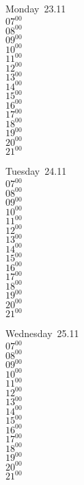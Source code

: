 \documentclass[11pt,a4paper]{book}\usepackage[]{graphicx}\usepackage[]{color}
\begin{document}
\begin{headerbox}
\end{headerbox}
\begin{weekdaybox}
  Monday~23.11\\
  { 
  \vfill
  $07^{00}$\\
$08^{00}$\\
$09^{00}$\\
$10^{00}$\\
$11^{00}$\\
$12^{00}$\\
$13^{00}$\\
$14^{00}$\\
$15^{00}$\\
$16^{00}$\\
$17^{00}$\\
$18^{00}$\\
$19^{00}$\\
$20^{00}$\\
$21^{00}$\\
  }
\end{weekdaybox}
\begin{weekdaybox}
  Tuesday~24.11\\
  { 
  \vfill
  $07^{00}$\\
$08^{00}$\\
$09^{00}$\\
$10^{00}$\\
$11^{00}$\\
$12^{00}$\\
$13^{00}$\\
$14^{00}$\\
$15^{00}$\\
$16^{00}$\\
$17^{00}$\\
$18^{00}$\\
$19^{00}$\\
$20^{00}$\\
$21^{00}$\\
  }
\end{weekdaybox}
\begin{weekdaybox}
  Wednesday~25.11\\
  { 
  \vfill
  $07^{00}$\\
$08^{00}$\\
$09^{00}$\\
$10^{00}$\\
$11^{00}$\\
$12^{00}$\\
$13^{00}$\\
$14^{00}$\\
$15^{00}$\\
$16^{00}$\\
$17^{00}$\\
$18^{00}$\\
$19^{00}$\\
$20^{00}$\\
$21^{00}$\\
  }
\end{weekdaybox}
\end{document}
